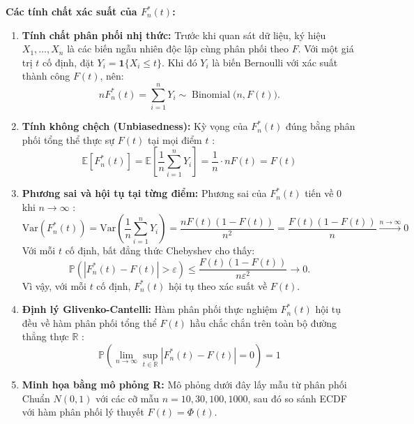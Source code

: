 	\textbf{Các tính chất xác suất của $F_n^*(t)$:}
	\begin{enumerate}
		\item \textbf{Tính chất phân phối nhị thức:}
		Trước khi quan sát dữ liệu, ký hiệu $X_1,\dots,X_n$ là các biến ngẫu
		nhiên độc lập cùng phân phối theo $F$. Với một giá trị $t$ cố định, đặt
		$Y_i=\mathbf{1}\{X_i\leq t\}$. Khi đó $Y_i$ là biến Bernoulli với xác
		suất thành công $F(t)$, nên:
		\begin{equation}
			nF_n^*(t)=\sum_{i=1}^{n}Y_i
			\sim \operatorname{Binomial}\bigl(n,F(t)\bigr).
		\end{equation}
		\item \textbf{Tính không chệch (Unbiasedness):} Kỳ vọng của $F_n^*(t)$ đúng bằng phân phối tổng thể thực sự $F(t)$ tại mọi điểm $t$ \cite{buithuytrang2026}:
		\begin{equation}
			\mathbb{E}[F_n^*(t)] = \mathbb{E}\left[\frac{1}{n}\sum_{i=1}^n Y_i\right] = \frac{1}{n} \cdot n F(t) = F(t)
		\end{equation}
		\item \textbf{Phương sai và hội tụ tại từng điểm:} Phương sai của $F_n^*(t)$ tiến về 0 khi $n \to \infty$ \cite{buithuytrang2026}:
		\begin{equation}
			\text{Var}\left(F_n^*(t)\right) = \text{Var}\left(\frac{1}{n}\sum_{i=1}^n Y_i\right) = \frac{n F(t)(1 - F(t))}{n^2} = \frac{F(t)(1 - F(t))}{n} \xrightarrow{n \to \infty} 0
		\end{equation}
		Với mỗi $t$ cố định, bất đẳng thức Chebyshev cho thấy:
		\begin{equation}
			\mathbb{P}\left(\left|F_n^*(t)-F(t)\right|>\varepsilon\right)
			\leq
			\frac{F(t)(1-F(t))}{n\varepsilon^2}
			\longrightarrow 0.
		\end{equation}
		Vì vậy, với mỗi $t$ cố định, $F_n^*(t)$ hội tụ theo xác suất về $F(t)$.
		\item \textbf{Định lý Glivenko-Cantelli:} Hàm phân phối thực nghiệm $F_n^*(t)$ hội tụ đều về hàm phân phối tổng thể $F(t)$ hầu chắc chắn trên toàn bộ đường thẳng thực $\mathbb{R}$ \cite{efron1993}:
		\begin{equation}
			\mathbb{P}\left( \lim_{n \to \infty} \sup_{t \in \mathbb{R}} |F_n^*(t) - F(t)| = 0 \right) = 1
		\end{equation}

	\newpage
		\item \textbf{Minh họa bằng mô phỏng R:} Mô phỏng dưới đây lấy mẫu từ phân phối Chuẩn $N(0,1)$ với các cỡ mẫu $n=10,30,100,1000$, sau đó so sánh ECDF với hàm phân phối lý thuyết $F(t)=\Phi(t)$.


\end{enumerate}
